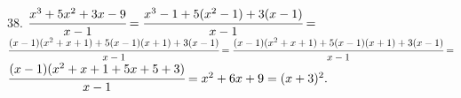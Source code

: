 38. $\cfrac{x^3+5x^2+3x-9}{x-1}=\cfrac{x^3-1+5(x^2-1)+3(x-1)}{x-1}=$\\$\cfrac{(x-1)(x^2+x+1)+5(x-1)(x+1)+3(x-1)}{x-1}=
\cfrac{(x-1)(x^2+x+1)+5(x-1)(x+1)+3(x-1)}{x-1}=$\\$\cfrac{(x-1)(x^2+x+1+5x+5+3)}{x-1}=x^2+6x+9=(x+3)^2.$\\
